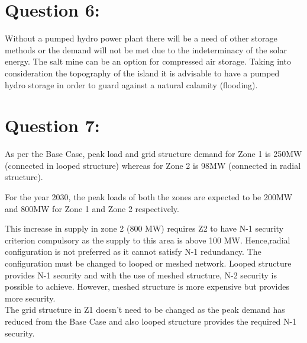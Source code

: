 \section*{\textbf{Question 6:}}
 Without a pumped hydro power plant there will be a need of other storage methods or the demand will not be met due to the indeterminacy of the solar energy. The salt mine can be an option for compressed air storage. Taking into consideration the topography of the island it is advisable to have a pumped hydro storage in order to guard against a natural calamity (flooding).
 
\section*{\textbf{Question 7:}}
As per the Base Case, peak load and grid structure demand for Zone 1 is 250MW (connected in looped structure) whereas for Zone 2 is 98MW (connected in radial structure). 

For the year 2030, the peak loads of both the zones are expected to be 200MW and 800MW for Zone 1 and Zone 2 respectively.

This increase in supply in zone 2 (800 MW) requires Z2 to have N-1 security criterion compulsory as the supply to this area is above 100 MW. Hence,radial configuration is not preferred as it cannot satisfy N-1 redundancy. The configuration must be changed to looped or meshed network. Looped structure provides N-1 security and with the use of meshed structure, N-2 security is possible to achieve. However, meshed structure is more expensive but provides more security.\\
The grid structure in Z1 doesn't need to be changed as the peak demand has reduced from the Base Case and also looped structure provides the required N-1 security.

